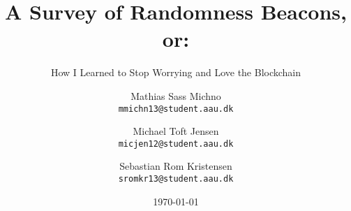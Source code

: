 \newcommand{\TITLE}{A Survey of Randomness Beacons, or:}
\newcommand{\SUBTITLE}{How I Learned to Stop Worrying and Love the Blockchain}
\newcommand{\GROUP}{deis923e17}
\newcommand{\PERIOD}{Fall semester, 2017}
\newcommand{\MEMBERS}{%
    Mathias Sass Michno\\
    Michael Toft Jensen\\
    Sebastian Rom Kristensen
}
\newcommand{\SUPERVISOR}{Stefan Schmid}
\newcommand{\COMPLETION}{January 12, 2017}

\title{\TITLE}
\subtitle{\SUBTITLE}
\author{
    Mathias Sass Michno\\
    \texttt{mmichn13@student.aau.dk}
    \and
    Michael Toft Jensen\\
    \texttt{micjen12@student.aau.dk}
    \and
    Sebastian Rom Kristensen\\
    \texttt{sromkr13@student.aau.dk}
}
\date{\today}
